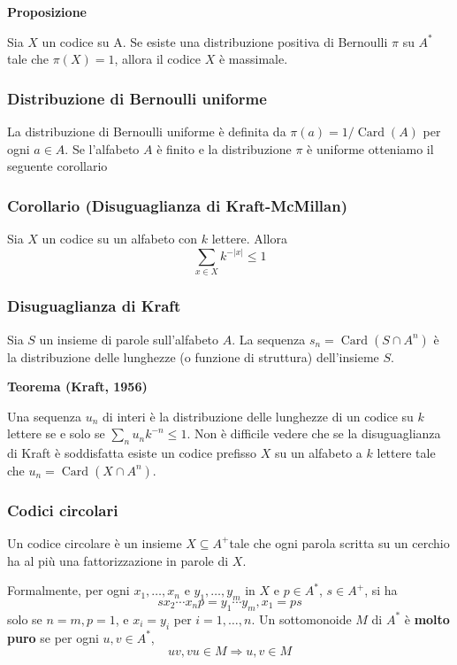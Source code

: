 \textbf{Proposizione}

Sia $X$ un codice su A. Se esiste una distribuzione positiva di Bernoulli $\pi$ su $A^{*}$ tale che $\pi(X)=1$, allora il codice $X$ è massimale.

\subsubsection{Distribuzione di Bernoulli uniforme}

La distribuzione di Bernoulli uniforme è definita da $\pi(a)=1 / \operatorname{Card}(A)$ per ogni $a \in A$.
Se l'alfabeto $A$ è finito e la distribuzione $\pi$ è uniforme otteniamo il seguente corollario

\subsubsection{Corollario (Disuguaglianza di Kraft-McMillan)}

Sia $X$ un codice su un alfabeto con $k$ lettere. Allora
$$
\sum_{x \in X} k^{-|x|} \leq 1
$$

\subsubsection{Disuguaglianza di Kraft}

Sia $S$ un insieme di parole sull'alfabeto $A$. La sequenza $s_{n}=\operatorname{Card}\left(S \cap A^{n}\right)$ è la distribuzione delle lunghezze (o funzione di struttura) dell'insieme $S$.

\vspace{5mm}


\textbf{Teorema (Kraft, 1956)}


Una sequenza $u_{n}$ di interi è la distribuzione delle lunghezze di un codice su $k$ lettere se e solo se $\sum_{n} u_{n} k^{-n} \leq 1$.
Non è difficile vedere che se la disuguaglianza di Kraft è soddisfatta esiste un codice prefisso $X$ su un alfabeto a $k$ lettere tale che $u_{n}=\operatorname{Card}\left(X \cap A^{n}\right)$.


\subsubsection{Codici circolari}

Un codice circolare è un insieme $X \subseteq A^{+}$tale che ogni parola scritta su un cerchio ha al più una fattorizzazione in parole di $X$.

Formalmente, per ogni $x_{1}, \ldots, x_{n}$ e $y_{1}, \ldots, y_{m}$ in $X$ e $p \in A^{*}$, $s \in A^{+}$, si ha
$$
s x_{2} \cdots x_{n} p=y_{1} \cdots y_{m}, x_{1}=p s
$$
solo se $n=m, p=1$, e $x_{i}=y_{i}$ per $i=1, \ldots, n$.
Un sottomonoide $M$ di $A^{*}$ è \textbf{molto puro} se per ogni $u, v \in A^{*}$,
$$
u v, v u \in M \Rightarrow u, v \in M
$$

